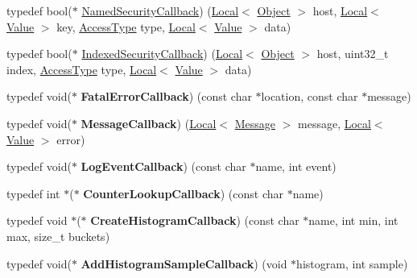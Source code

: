 \begin{DoxyCompactItemize}
\item 
typedef bool($\ast$ \hyperlink{namespacev8_ab5cafda0c556bba990c660ce9c904e0d}{Named\+Security\+Callback}) (\hyperlink{classv8_1_1Local}{Local}$<$ \hyperlink{classv8_1_1Object}{Object} $>$ host, \hyperlink{classv8_1_1Local}{Local}$<$ \hyperlink{classv8_1_1Value}{Value} $>$ key, \hyperlink{namespacev8_add8bef6469c5b94706584124e610046c}{Access\+Type} type, \hyperlink{classv8_1_1Local}{Local}$<$ \hyperlink{classv8_1_1Value}{Value} $>$ data)
\item 
typedef bool($\ast$ \hyperlink{namespacev8_aebbcc7837753e51112d944ad96520da1}{Indexed\+Security\+Callback}) (\hyperlink{classv8_1_1Local}{Local}$<$ \hyperlink{classv8_1_1Object}{Object} $>$ host, uint32\+\_\+t index, \hyperlink{namespacev8_add8bef6469c5b94706584124e610046c}{Access\+Type} type, \hyperlink{classv8_1_1Local}{Local}$<$ \hyperlink{classv8_1_1Value}{Value} $>$ data)
\item 
\hypertarget{namespacev8_abc93f69508701f18dc5cc0ce165616aa}{}typedef void($\ast$ {\bfseries Fatal\+Error\+Callback}) (const char $\ast$location, const char $\ast$message)\label{namespacev8_abc93f69508701f18dc5cc0ce165616aa}

\item 
\hypertarget{namespacev8_a871380126ff63a699e78cb83d8d613a6}{}typedef void($\ast$ {\bfseries Message\+Callback}) (\hyperlink{classv8_1_1Local}{Local}$<$ \hyperlink{classv8_1_1Message}{Message} $>$ message, \hyperlink{classv8_1_1Local}{Local}$<$ \hyperlink{classv8_1_1Value}{Value} $>$ error)\label{namespacev8_a871380126ff63a699e78cb83d8d613a6}

\item 
\hypertarget{namespacev8_a1516c6948fdca41f79410b7ff91aeaf0}{}typedef void($\ast$ {\bfseries Log\+Event\+Callback}) (const char $\ast$name, int event)\label{namespacev8_a1516c6948fdca41f79410b7ff91aeaf0}

\item 
\hypertarget{namespacev8_a5efca05a9f1f278a4eec832ce419104f}{}typedef int $\ast$($\ast$ {\bfseries Counter\+Lookup\+Callback}) (const char $\ast$name)\label{namespacev8_a5efca05a9f1f278a4eec832ce419104f}

\item 
\hypertarget{namespacev8_aafbf15734701792a14c02dbca7535b75}{}typedef void $\ast$($\ast$ {\bfseries Create\+Histogram\+Callback}) (const char $\ast$name, int min, int max, size\+\_\+t buckets)\label{namespacev8_aafbf15734701792a14c02dbca7535b75}

\item 
\hypertarget{namespacev8_a5a7c6bb8050ad84f0a453056ec325d1c}{}typedef void($\ast$ {\bfseries Add\+Histogram\+Sample\+Callback}) (void $\ast$histogram, int sample)\label{namespacev8_a5a7c6bb8050ad84f0a453056ec325d1c}


\end{DoxyCompactItemize}
